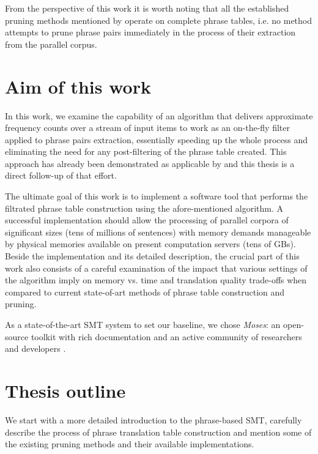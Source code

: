 From the perspective of this work it is worth noting that all the established pruning methods
mentioned by \citet{zens:systcomp} operate on complete phrase tables, i.e. no method attempts
to prune phrase pairs immediately in the process of their extraction from the parallel corpus.

\section{Aim of this work}

In this work, we examine the capability of an algorithm that delivers approximate
frequency counts over a stream of input items \citep{manku:lossycounting} to
work as an on-the-fly filter applied to phrase pairs extraction,
essentially speeding up the whole process and eliminating the need for
any post-filtering of the phrase table created.
This approach has already been demonstrated as applicable by \citet{przywara:eppex}
and this thesis is a direct follow-up of that effort.

The ultimate goal of this work is to implement a software tool that performs
the filtrated phrase table construction using the afore-mentioned algorithm.
A successful implementation should allow the processing of parallel corpora of
significant sizes (tens of millions of sentences) with memory demands manageable
by physical memories available on present computation servers (tens of GBs).
Beside the implementation and its detailed description, the crucial part of
this work also consists of a careful examination of the impact that various
settings of the algorithm imply on memory vs. time and translation quality
trade-offs when compared to current state-of-art methods of phrase table
construction and pruning.

As a state-of-the-art SMT system to set our baseline, we chose \emph{Moses}:
an open-source toolkit with rich documentation and an active community of researchers
and developers \citep{koehn:moses}.

\section{Thesis outline}

We start with a more detailed introduction to the phrase-based SMT,
carefully describe the process of phrase translation table construction
and mention some of the existing pruning methods and their available
implementations.

